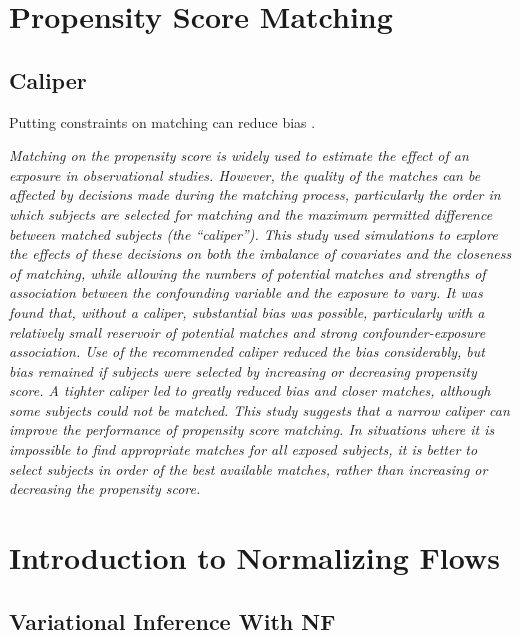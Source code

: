 \documentclass[
  11pt,
]{book}
\begin{document}
\hypertarget{propensity-score-matching}{%
\chapter{Propensity Score Matching}\label{propensity-score-matching}}

\hypertarget{caliper}{%
\section{Caliper}\label{caliper}}

Putting constraints on matching can reduce bias \citep{10.1093/aje/kwt212}.

\emph{Matching on the propensity score is widely used to estimate the effect of an exposure in observational studies. However, the quality of the matches can be affected by decisions made during the matching process, particularly the order in which subjects are selected for matching and the maximum permitted difference between matched subjects (the ``caliper''). This study used simulations to explore the effects of these decisions on both the imbalance of covariates and the closeness of matching, while allowing the numbers of potential matches and strengths of association between the confounding variable and the exposure to vary. It was found that, without a caliper, substantial bias was possible, particularly with a relatively small reservoir of potential matches and strong confounder-exposure association. Use of the recommended caliper reduced the bias considerably, but bias remained if subjects were selected by increasing or decreasing propensity score. A tighter caliper led to greatly reduced bias and closer matches, although some subjects could not be matched. This study suggests that a narrow caliper can improve the performance of propensity score matching. In situations where it is impossible to find appropriate matches for all exposed subjects, it is better to select subjects in order of the best available matches, rather than increasing or decreasing the propensity score.}

\hypertarget{introduction-to-normalizing-flows}{%
\chapter{Introduction to Normalizing Flows}\label{introduction-to-normalizing-flows}}

\hypertarget{variational-inference-with-nf}{%
\section{Variational Inference With NF}\label{variational-inference-with-nf}}
\end{document}
